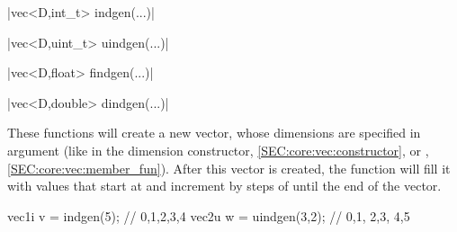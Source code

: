 \funcitem \cppinline|vec<D,int_t>  indgen(...)| 

\cppinline|vec<D,uint_t> uindgen(...)| 

\cppinline|vec<D,float>  findgen(...)| 

\cppinline|vec<D,double> dindgen(...)| 

These functions will create a new vector, whose dimensions are specified in argument (like in the dimension constructor, \ref{SEC:core:vec:constructor}, or , \ref{SEC:core:vec:member_fun}). After this vector is created, the function will fill it with values that start at  and increment by steps of  until the end of the vector.

\begin{example}
\begin{cppcode}
vec1i v = indgen(5);    // {0,1,2,3,4}
vec2u w = uindgen(3,2); // {{0,1}, {2,3}, {4,5}}
\end{cppcode}
\end{example}
